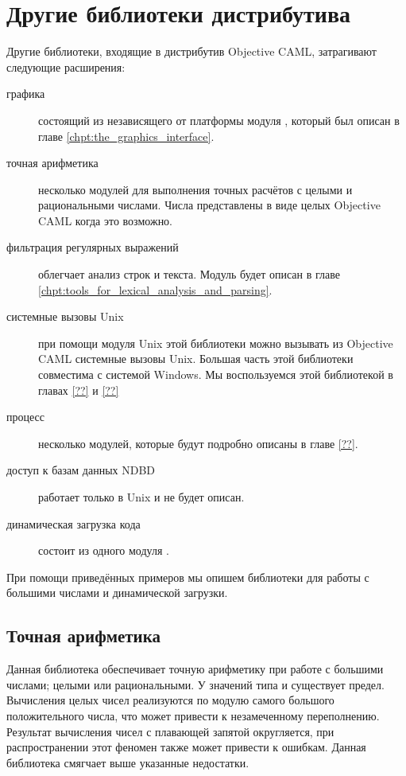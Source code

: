 \section{Другие библиотеки дистрибутива}
\label{sec:other_libraries_in_the_distribution}

Другие библиотеки, входящие в дистрибутив Objective CAML, затрагивают следующие
расширения:

\begin{description}
	\item[графика] состоящий из независящего от платформы модуля
, который был описан в главе \ref{chpt:the_graphics_interface}.

	\item[точная арифметика] несколько модулей для выполнения точных расчётов с
целыми и рациональными числами. Числа представлены в виде целых Objective CAML
когда это возможно.

	\item[фильтрация регулярных выражений] облегчает анализ строк и текста.
Модуль  будет описан в главе
\ref{chpt:tools_for_lexical_analysis_and_parsing}.

	\item[системные вызовы Unix] при помощи модуля Unix этой библиотеки можно
вызывать из Objective CAML системные вызовы Unix. Большая часть этой библиотеки
совместима с системой Windows. Мы воспользуемся этой библиотекой в главах
\ref{??} и \ref{??}

	\item[ процесс] несколько модулей, которые будут подробно
описаны в главе \ref{??}.

	\item[доступ к базам данных NDBD] работает только в Unix и не будет описан.

	\item[динамическая загрузка кода] состоит из одного модуля .
\end{description}

При помощи приведённых примеров мы опишем библиотеки для работы с большими 
числами и динамической загрузки. 

\subsection{Точная арифметика}
\label{subsec:exact_math}

Данная библиотека обеспечивает точную арифметику при работе с большими числами; 
целыми или рациональными. У значений типа  и  существует 
предел. Вычисления целых чисел реализуются по модулю самого большого 
положительного числа, что может привести к незамеченному переполнению. 
Результат вычисления чисел с плавающей запятой округляется, при распространении 
этот феномен также может привести к ошибкам. Данная библиотека смягчает выше 
указанные недостатки.

